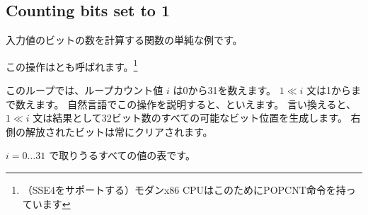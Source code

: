 ﻿\subsection{Counting bits set to 1}

入力値のビットの数を計算する関数の単純な例です。

この操作はとも呼ばれます。\footnote{（SSE4をサポートする）モダンx86 CPUはこのためにPOPCNT命令を持っています}



このループでは、ループカウント値 $i$ は0から31を数えます。
$1 \ll i$ 文は1からまで数えます。
自然言語でこの操作を説明すると、といえます。
言い換えると、$1 \ll i$ 文は結果として32ビット数のすべての可能なビット位置を生成します。
右側の解放されたビットは常にクリアされます。

\label{2n_numbers_table}
$i=0 \ldots 31$ で取りうるすべての値の表です。

